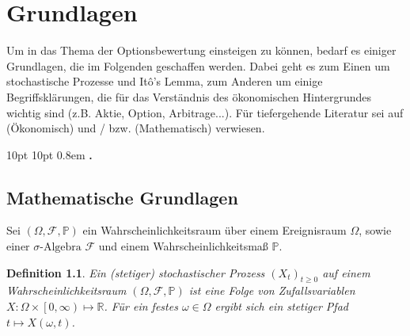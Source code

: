 
\chapter{Grundlagen}


Um in das Thema der Optionsbewertung einsteigen zu können, bedarf es einiger Grundlagen, die im Folgenden geschaffen werden. Dabei geht es zum Einen um stochastische Prozesse und Itô's Lemma, zum Anderen um einige Begriffsklärungen, die für das Verständnis des ökonomischen Hintergrundes wichtig sind (z.B. Aktie, Option, Arbitrage...). Für tiefergehende Literatur sei auf \cite{Hull} (Ökonomisch) und \cite{Kupper1}/\cite{Kupper2} bzw. \cite{Bauer} (Mathematisch) verwiesen.

{10pt}%
{10pt}%
{\normalfont}%
{}%
{\normalfont}%
{}%
{0.8em}%
{\bfseries{.}}%
 


\theoremstyle{normal}
\newtheorem{Definition}{Definition}[chapter]
\newtheorem{satz}[Definition]{Satz}
\newtheorem{bsp}[Definition]{Beispiel}
\newtheorem{Lemma}[Definition]{Lemma}
\newtheorem{Theorem}[Definition]{Theorem} 
\newtheorem*{Bemerkung}{Bemerkung}



\section{Mathematische Grundlagen}            %
\label{cha:MathematischeGrundlagen}           %

Sei $ \left(\Omega,\mathcal{F},\mathbb{P}\right) $ ein Wahrscheinlichkeitsraum über einem Ereignisraum $\Omega$, sowie einer $\sigma\text{-Algebra  }\mathcal{F}$ und einem Wahrscheinlichkeitsmaß $\mathbb{P}$.
\begin{Definition}
Ein (stetiger) stochastischer Prozess $\left(X_t\right)_{t\geq0}$ auf einem Wahrscheinlichkeitsraum $ \left(\Omega,\mathcal{F},\mathbb{P}\right) $ ist eine Folge von Zufallsvariablen  $X: \Omega \times \left[0,\infty \right) \mapsto \mathbb{R} $. Für ein festes $\omega \in \Omega$ ergibt sich ein stetiger Pfad $t \mapsto X\left(\omega,t\right)$.
\end{Definition}

